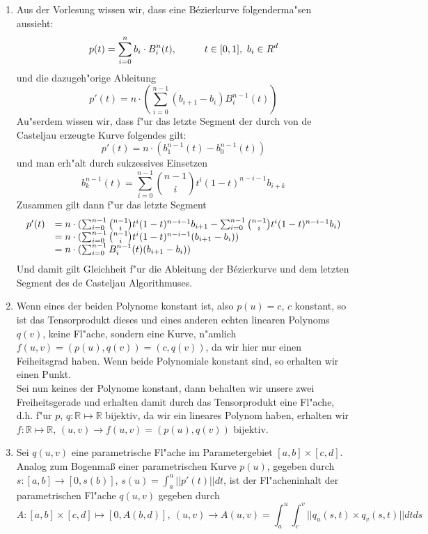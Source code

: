 \documentclass[a4paper,10pt]{scrartcl}
\begin{document}
\vspace*{5pt}
\begin{enumerate}[1.]

\item Aus der Vorlesung wissen wir, dass eine B\'ezierkurve folgenderma"sen aussieht:
$$p(t) = \sum_{i=0}^{n} b_i \cdot B_i^n(t), \hspace*{1.0 cm} t \in [0,1],~ b_i \in R^d$$
und die dazugeh"orige Ableitung
$$p'(t) = n \cdot (\sum_{i=0}^{n-1}(b_{i+1} - b_i )B_i^{n-1}(t))$$
Au"serdem wissen wir, dass f"ur das letzte Segment der durch von de Casteljau erzeugte Kurve folgendes gilt:
$$p'(t) = n \cdot (b_1^{n-1} (t) - b_0^{n-1}(t))$$
und man erh"alt durch sukzessives Einsetzen
$$b_k^{n-1}(t) = \sum_{i=0}^{n-1} {{n-1}\choose{i}} t^i (1-t)^{n-i-1} b_{i+k}$$
Zusammen gilt dann f"ur das letzte Segment
$$\begin{array}{ c l }
p'(t) & = n \cdot (\sum_{i=0}^{n-1} {{{n-1}\choose{i}} t^i (1-t)^{n-i-1} b_{i+1}} - \sum_{i=0}^{n-1} {{{n-1}\choose{i}} t^i (1-t)^{n-i-1} b_{i}})\\
& = n \cdot (\sum_{i=0}^{n-1} {{{n-1}\choose{i}} t^i (1-t)^{n-i-1} (b_{i+1} - b_{i})})\\
& = n \cdot (\sum_{i=0}^{n-1} {B_i^{n-1}(t) (b_{i+1} - b_{i})})\\
\end{array}$$
Und damit gilt Gleichheit f"ur die Ableitung der Bézierkurve und dem letzten Segment des de Casteljau Algorithmuses. 

\item Wenn eines der beiden Polynome konstant ist, also $p(u) = c$, $c$ konstant, so ist das Tensorprodukt dieses und eines anderen echten linearen Polynoms $q(v)$, keine Fl"ache, sondern eine Kurve, n"amlich $f(u,v) = (p(u), q(v)) = (c, q(v))$, da wir hier nur einen Feiheitsgrad haben. Wenn beide Polynomiale konstant sind, so erhalten wir einen Punkt.\\
Sei nun keines der Polynome konstant, dann behalten wir unsere zwei Freiheitsgerade und erhalten damit durch das Tensorprodukt eine Fl"ache, d.h. f"ur $p$, $q: \mathbb{R} \mapsto \mathbb{R}$ bijektiv, da wir ein lineares Polynom haben, erhalten wir $f: \mathbb{R} \mapsto \mathbb{R}$, $(u,v) \to f(u,v) = (p(u), q(v))$ bijektiv.

\item Sei $q(u,v)$ eine parametrische Fl"ache im Parametergebiet $[a,b] \times [c,d]$. Analog zum Bogenmaß einer parametrischen Kurve $p(u)$, gegeben durch $s:[a,b] \rightarrow [0,s(b)]$, $s(u) = \int_a^u {||p'(t)||dt}$, ist der Fl"acheninhalt der parametrischen Fl"ache $q(u,v)$ gegeben durch 
$$A:[a,b] \times [c,d] \mapsto [0,A(b,d)],~ (u,v) \to A(u,v) = \int_a^u \int_c^v {||q_u(s,t) \times q_v(s,t)||dtds}$$


\end{enumerate}
\end{document}
